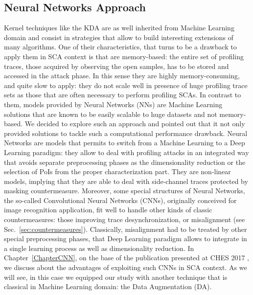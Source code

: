 \subsection{Neural Networks Approach}
Kernel techniques like the KDA  are as well inherited from Machine Learning domain and consist in strategies that allow to build interesting extensions of many algorithms. One of their characteristics, that turns to be a drawback to apply them in SCA context is that are memory-based: the entire set of profiling traces, \ie those acquired by observing the open samples, has to be stored and accessed in the attack phase. In this sense they are highly memory-consuming, and quite slow to apply: they do not scale well in presence of huge profiling trace sets as those that are often necessary to perform profiling SCAs. In contrast to them, models provided by Neural Networks (NNs) are Machine Learning solutions that are known to be easily scalable to huge datasets and not memory-based. We decided to explore such an approach and pointed out that it not only provided solutions to tackle such a computational performance drawback. Neural Networks are models that permits to switch from a Machine Learning to a Deep Learning paradigm: they allow to deal with profiling attacks in an integrated way that avoids separate preprocessing phases as the dimensionality reduction or the selection of PoIs from the proper characterization part. They are non-linear models, implying that they are able to deal with side-channel traces protected by masking countermeasure. Moreover, some special structures of Neural Networks, the so-called Convolutional Neural Networks (CNNs), originally conceived for image recognition application, fit well to handle other kinds of classic countermeasures: those improving trace desynchronization, or misalignment (see Sec.~\ref{sec:countermeasures}). Classically, misalignment had to be treated by other special preprocessing phases, that Deep Learning paradigm allows to integrate in a single learning process as well as dimensionality reduction. In Chapter~\ref{ChapterCNN}, on the base of the publication presented at CHES 2017 \cite{DBLP:conf/ches/CagliDP17}, we discuss about the advantages of exploiting such CNNs in SCA context. As we will see, in this case we equipped our study with another technique that is classical in Machine Learning domain: the Data Augmentation (DA). 

